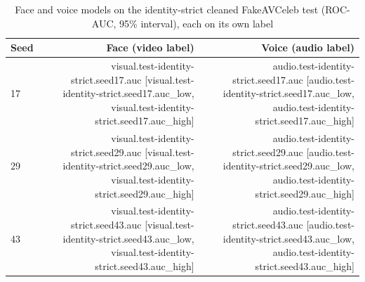 \documentclass[conference]{IEEEtran}
\begin{document}
\begin{table}[htbp]
\caption{Face and voice models on the identity-strict cleaned FakeAVCeleb test
(ROC-AUC, 95\% interval), each on its own label}
\label{tab:branches}
\centering
\begin{tabular}{lrr}
\toprule
Seed & Face (video label) & Voice (audio label) \\
\midrule
17 & {{visual.test-identity-strict.seed17.auc}} [{{visual.test-identity-strict.seed17.auc_low}}, {{visual.test-identity-strict.seed17.auc_high}}] & {{audio.test-identity-strict.seed17.auc}} [{{audio.test-identity-strict.seed17.auc_low}}, {{audio.test-identity-strict.seed17.auc_high}}] \\
29 & {{visual.test-identity-strict.seed29.auc}} [{{visual.test-identity-strict.seed29.auc_low}}, {{visual.test-identity-strict.seed29.auc_high}}] & {{audio.test-identity-strict.seed29.auc}} [{{audio.test-identity-strict.seed29.auc_low}}, {{audio.test-identity-strict.seed29.auc_high}}] \\
43 & {{visual.test-identity-strict.seed43.auc}} [{{visual.test-identity-strict.seed43.auc_low}}, {{visual.test-identity-strict.seed43.auc_high}}] & {{audio.test-identity-strict.seed43.auc}} [{{audio.test-identity-strict.seed43.auc_low}}, {{audio.test-identity-strict.seed43.auc_high}}] \\
\bottomrule
\end{tabular}
\end{table}
\end{document}
